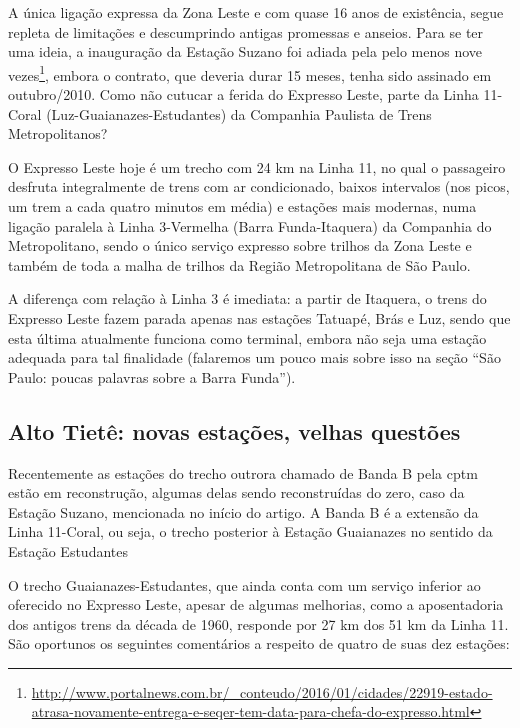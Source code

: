 \documentclass[11pt,fleqn]{book} %
\begin{document}
A única ligação expressa da Zona Leste e com quase 16 anos de existência, segue repleta de limitações e descumprindo antigas promessas e anseios. Para se ter uma ideia, a inauguração da Estação Suzano foi adiada pela pelo menos nove vezes\footnote{\url{http://www.portalnews.com.br/_conteudo/2016/01/cidades/22919-estado-atrasa-novamente-entrega-e-seqer-tem-data-para-chefa-do-expresso.html}}, embora o contrato, que deveria durar 15 meses, tenha sido assinado em outubro/2010. Como não cutucar a ferida do Expresso Leste, parte da Linha 11-Coral (Luz-Guaianazes-Estudantes) da Companhia Paulista de Trens Metropolitanos?

O Expresso Leste hoje é um trecho com 24 km na Linha 11, no qual o passageiro desfruta integralmente de trens com ar condicionado, baixos intervalos (nos picos, um trem a cada quatro minutos em média) e estações mais modernas, numa ligação paralela à Linha 3-Vermelha (Barra Funda-Itaquera) da Companhia do Metropolitano, sendo o único serviço expresso sobre trilhos da Zona Leste e também de toda a malha de trilhos da Região Metropolitana de São Paulo.


A diferença com relação à Linha 3 é imediata: a partir de Itaquera, o trens do Expresso Leste fazem parada apenas nas estações Tatuapé, Brás e Luz, sendo que esta última atualmente funciona como terminal, embora não seja uma estação adequada para tal finalidade (falaremos um pouco mais sobre isso na seção “São Paulo: poucas palavras sobre a Barra Funda”).

\subsection{Alto Tietê: novas estações, velhas questões}

Recentemente as estações do trecho outrora chamado de Banda B pela \gls{cptm} estão em reconstrução, algumas delas sendo reconstruídas do zero, caso da Estação Suzano, mencionada no início do artigo. A Banda B é a extensão da Linha 11-Coral, ou seja, o trecho posterior à Estação Guaianazes no sentido da Estação Estudantes


O trecho Guaianazes-Estudantes, que ainda conta com um serviço inferior ao oferecido no Expresso Leste, apesar de algumas melhorias, como a aposentadoria dos antigos trens da década de 1960, responde por 27 km dos 51 km da Linha 11. São oportunos os seguintes comentários a respeito de quatro de suas dez estações:
\end{document}
